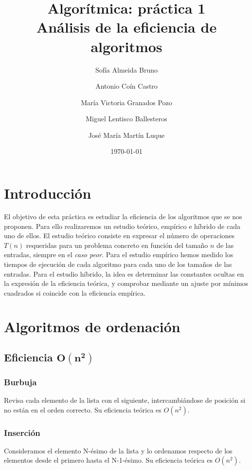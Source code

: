 \documentclass[11pt]{article}
\title{Algorítmica: práctica 1 \\ \large Análisis de la eficiencia de algoritmos}
\author{Sofía Almeida Bruno \and Antonio Coín Castro \and María Victoria Granados Pozo \and Miguel Lentisco Ballesteros \and José María Martín Luque}
\date{\today}
\begin{document}
\maketitle

\newpage

\section*{Introducción}
El objetivo de esta práctica es estudiar la eficiencia de los algoritmos que se nos proponen. Para ello realizaremos un estudio teórico, empírico e híbrido de cada uno de ellos. 
El estudio teórico consiste en expresar el número de operaciones $T(n)$ requeridas para un problema concreto en función del tamaño $n$ de las entradas, siempre en el \textit{caso peor}. Para el estudio empírico hemos medido los tiempos de ejecución de cada algoritmo para cada uno de los tamaños de las entradas. Para el estudio híbrido, la idea es determinar las constantes ocultas en la expresión de la eficiencia teórica, y comprobar mediante un ajuste por mínimos cuadrados si coincide con la eficiencia empírica.

\section*{Algoritmos de ordenación}
\subsection*{Eficiencia $\boldsymbol{O(n^2)}$}
\subsubsection*{Burbuja}
Revisa cada elemento de la lista con el siguiente, intercambiándose de posición si no están en el orden correcto. Su eficiencia teórica es $O(n^2)$.
\begin{center}
	
\end{center}
\newpage
\subsubsection*{Inserción}
Consideramos el elemento N-ésimo de la lista y lo ordenamos respecto de los elementos desde el primero hasta el N-1-ésimo. Su eficiencia teórica es $O(n^2)$.
\begin{center}
	
\end{center}
\end{document}
